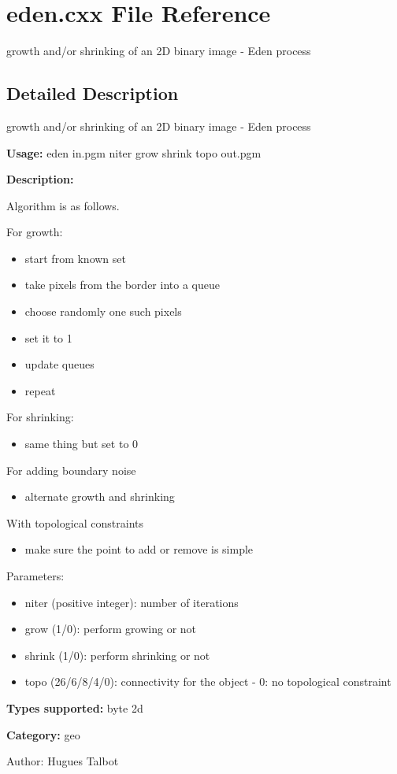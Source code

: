 \section{eden.cxx File Reference}
\label{eden_8cxx}
growth and/or shrinking of an 2D binary image - Eden process 



\subsection{Detailed Description}
growth and/or shrinking of an 2D binary image - Eden process 

{\bf Usage:} eden in.pgm niter grow shrink topo out.pgm

{\bf Description:}

Algorithm is as follows.

For growth: \begin{itemize}
\item start from known set \item take pixels from the border into a queue \item choose randomly one such pixels \item set it to 1 \item update queues \item repeat\end{itemize}
For shrinking: \begin{itemize}
\item same thing but set to 0\end{itemize}
For adding boundary noise \begin{itemize}
\item alternate growth and shrinking\end{itemize}
With topological constraints \begin{itemize}
\item make sure the point to add or remove is simple\end{itemize}
Parameters: \begin{itemize}
\item niter (positive integer): number of iterations \item grow (1/0): perform growing or not \item shrink (1/0): perform shrinking or not \item topo (26/6/8/4/0): connectivity for the object - 0: no topological constraint\end{itemize}
{\bf Types supported:} byte 2d

{\bf Category:} geo

\begin{Desc}
\item[Author:]Hugues Talbot \end{Desc}
